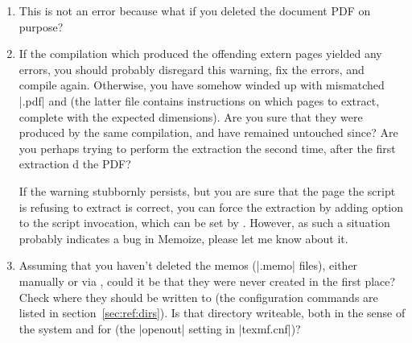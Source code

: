 \documentclass[a4paper,11pt]{article}
\begin{document}
\begin{enumerate}

\item {}

  This is not an error because what if you deleted the document PDF on purpose?
  
\item\label{item:warning:extract:unexpected-size} 

  If the compilation which produced the offending extern pages yielded any
  errors, you should probably disregard this warning, fix the errors, and
  compile again.  Otherwise, you have somehow winded up with mismatched
  |.pdf| and \dmmz (the latter file contains
  instructions on which pages to extract, complete with the expected
  dimensions).  Are you sure that they were produced by the same compilation,
  and have remained untouched since?  Are you perhaps trying to perform the
  extraction the second time, after the first extraction
  d the PDF?

  If the warning stubbornly persists, but you are sure that the page the script
  is refusing to extract is correct, you can force the extraction by adding
  option  to the script invocation, which
  can be set by .  However, as such a situation
  probably indicates a bug in Memoize, please let me know about it.

\item {}

  Assuming that you haven't deleted the memos (|.memo| files), either manually
  or via , could it be that they were never created
  in the first place?  Check where they should be written to (the configuration
  commands are listed in section~\ref{sec:ref:dirs}).  Is that directory
  writeable, both in the sense of the system and for  (the
  |openout| setting in |texmf.cnf|)?
  
 
\end{enumerate}
  
\end{document}
